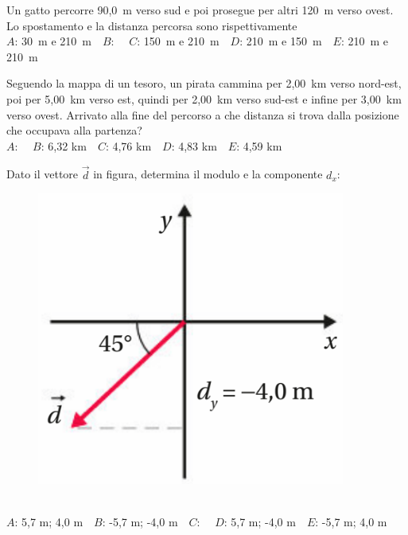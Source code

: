 \mcquestionfooter



\def\mcquestionnumber{11}


\mcquestionheader Un gatto percorre 90,0~m verso sud e poi prosegue per altri 120~m verso ovest. Lo spostamento e la distanza percorsa sono rispettivamente\\
{$A$}: 30~m e 210~m\ \ {$B$}: \ \ {$C$}: 150~m e 210~m\ \ {$D$}: 210~m e 150~m\ \ {$E$}: 210~m e 210~m\ \ 

\mcquestionfooter



\def\mcquestionnumber{12}


\mcquestionheader Seguendo la mappa di un tesoro, un pirata cammina per 2,00~km verso nord-est, poi per 5,00~km verso est, quindi per 2,00~km verso sud-est e infine per 3,00~km verso ovest. Arrivato alla fine del percorso a che distanza si trova dalla posizione che occupava alla partenza?\\
{$A$}: \ \ {$B$}: 6,32 km\ \ {$C$}: 4,76 km\ \ {$D$}: 4,83 km\ \ {$E$}: 4,59 km\ \ 

\mcquestionfooter



\mcpaperfooter

\def\mcserialnumber{13}
\mcpaperheader


\def\mcquestionnumber{1}


\mcquestionheader Dato il vettore $\vec{d}$ in figura, determina il modulo e la componente $d_x$: \begin{figure}[h!]   \begin{center}     \includegraphics[scale=0.35]{vettored.png}   \end{center} \end{figure}\\
{$A$}: 5,7 m; 4,0 m\ \ {$B$}: -5,7 m; -4,0 m\ \ {$C$}: \ \ {$D$}: 5,7 m; -4,0 m\ \ {$E$}: -5,7 m; 4,0 m\ \ 

